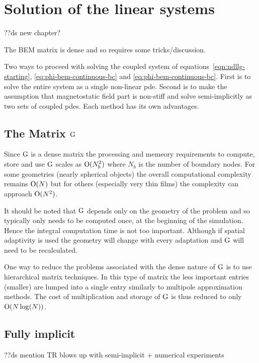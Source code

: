 \section{Solution of the linear systems}
\label{sec:solution-strategies}

??ds new chapter?

The BEM matrix is dense and so requires some tricks/discussion.

Two ways to proceed with solving the coupled system of equations~\eqref{eqn:ndllg-starting}, \eqref{eq:phi-bem-continuous-bc} and \eqref{eq:phi-bem-continuous-bc}.
First is to solve the entire system as a single non-linear pde.
Second is to make the assumption that magnetostatic field part is non-stiff and solve semi-implicitly as two sets of coupled pdes.
Each method has its own advantages.


\subsection{The Matrix ${\mathbf{\mathrm{G}}}$}

Since ${\mathbf{\mathrm{G}}}$ is a dense matrix the processing and memeory requirements to compute, store and use ${\mathbf{\mathrm{G}}}$ scales as $\text{O}(N_b^2)$ where $N_b$ is the number of boundary nodes. For some geometries (\eg nearly spherical objects) the overall computational complexity remains $\text{O}(N)$ but for others (especially very thin films) the complexity can approach $\text{O}(N^2)$.

It should be noted that ${\mathbf{\mathrm{G}}}$ depends only on the geometry of the problem and so typically only needs to be computed once, at the beginning of the simulation. Hence the integral computation time is not too important. Although if spatial adaptivity is used the geometry will change with every adaptation and ${\mathbf{\mathrm{G}}}$ will need to be recalculated.

One way to reduce the problems associated with the dense nature of ${\mathbf{\mathrm{G}}}$ is to use hierarchical matrix techniques. In this type of matrix the less important entries (\ie smaller) are lumped into a single entry similarly to multipole approximation methods. The cost of multiplication and storage of ${\mathbf{\mathrm{G}}}$ is thus reduced to only $\text{O}(N \log(N))$.\cite{Knittel2009}


\subsection{Fully implicit}

??ds mention TR blows up with semi-implicit + numerical experiments


